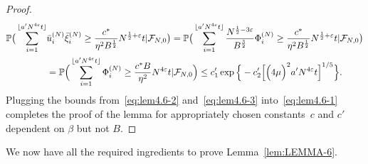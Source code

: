 \documentclass[11pt, reqno]{article}
\numberwithin{equation}{section}
\numberwithin{theorem}{section}
\begin{document}
\begin{appendix}
\begin{proof}
\begin{equation}
    \begin{split}\label{eq:lem4.6-3}
         \mathbb{P}\big(\sum_{i=1}^{\lfloor a'N^{4\varepsilon}t\rfloor}&\Bar{u}^{(N)}_i\Bar{\xi}^{(N)}_i\geq \frac{c^{*}}{\eta^2B^{\frac{1}{2}}}N^{\frac{1}{2}+\varepsilon}t|\mathcal{F}_{N,0}\big)
    = \mathbb{P}\big(\sum_{i=1}^{\lfloor a'N^{4\varepsilon}t\rfloor} \frac{N^{\frac{1}{2}- 3\varepsilon}}{B^{\frac{3}{2}}}\Phi_i^{(N)}
    \geq \frac{c^{*}}{\eta^2B^{\frac{1}{2}}}N^{\frac{1}{2}+\varepsilon}t|\mathcal{F}_{N,0}\big)\\
    &= \mathbb{P}\Big(\sum_{i=1}^{\lfloor a'N^{4\varepsilon}t \rfloor} \Phi_i^{(N)}
    \geq \frac{c^{*}B}{\eta^2}N^{4\varepsilon}t|\mathcal{F}_{N,0}\Big)
    \leq c'_1 \exp \Big\{-c'_2 \Big[\Big(4\mu\Big)^2 a' N^{4\varepsilon}t\Big]^{1/5}\Big\}.
    \end{split}
\end{equation}
Plugging the bounds from~\eqref{eq:lem4.6-2} and~\eqref{eq:lem4.6-3} into~\eqref{eq:lem4.6-1} completes the proof of the lemma for appropriately chosen constants~$c$ and $c'$ dependent on $\beta$ but not $B$.
\end{proof}

We now have all the required ingredients to prove Lemma~\ref{lem:LEMMA-6}.



\end{appendix}
\end{document}
